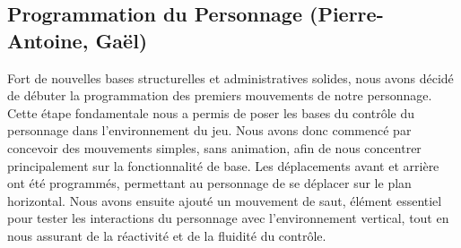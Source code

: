 \documentclass{report}
\begin{document}
\subsection*{Programmation du Personnage (Pierre-Antoine, Gaël)}
Fort de nouvelles bases structurelles et administratives solides, nous avons décidé de débuter la programmation des premiers mouvements de notre personnage. Cette étape fondamentale nous a permis de poser les bases du contrôle du personnage dans l'environnement du jeu. Nous avons donc commencé par concevoir des mouvements simples, sans animation, afin de nous concentrer principalement sur la fonctionnalité de base. Les déplacements avant et arrière ont été programmés, permettant au personnage de se déplacer sur le plan horizontal. Nous avons ensuite ajouté un mouvement de saut, élément essentiel pour tester les interactions du personnage avec l'environnement vertical, tout en nous assurant de la réactivité et de la fluidité du contrôle.


\newpage %
\end{document}
